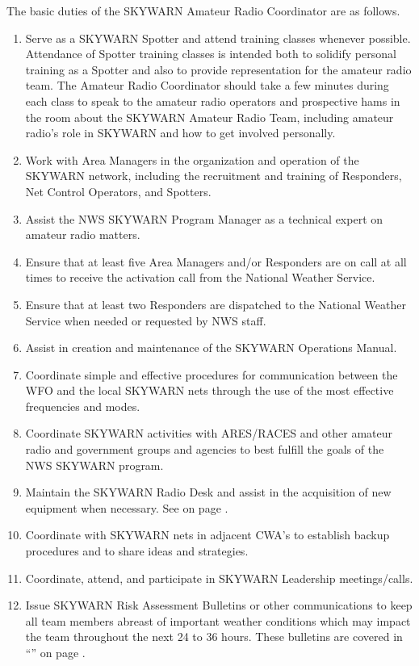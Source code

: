 \documentclass[pdflatex,letterpaper,twoside,12pt]{book}
\begin{document}
The basic duties of the SKYWARN Amateur Radio Coordinator are as follows.

\begin{enumerate}
\item Serve as a SKYWARN Spotter and attend training classes whenever possible.  Attendance of Spotter training classes is intended both to solidify personal training as a Spotter and also to provide representation for the amateur radio team.  The Amateur Radio Coordinator should take a few minutes during each class to speak to the amateur radio operators and prospective hams in the room about the SKYWARN Amateur Radio Team, including amateur radio's role in SKYWARN and how to get involved personally.
\item Work with Area Managers in the organization and operation of the SKYWARN network, including the recruitment and training of Responders, Net Control Operators, and Spotters.
\item Assist the NWS SKYWARN Program Manager as a technical expert on amateur radio matters.
\item Ensure that at least five Area Managers and/or Responders are on call at all times to receive the activation call from the National Weather Service.
\item Ensure that at least two Responders are dispatched to the National Weather Service when needed or requested by NWS staff.
\item Assist in creation and maintenance of the SKYWARN Operations Manual.
\item Coordinate simple and effective procedures for communication between the WFO and the local SKYWARN nets through the use of the most effective frequencies and modes.
\item Coordinate SKYWARN activities with ARES/RACES and other amateur radio and government groups and agencies to best fulfill the goals of the NWS SKYWARN program.
\item Maintain the SKYWARN Radio Desk and assist in the acquisition of new equipment when necessary.  See  on page \pageref{wx4akq-maint}.
\item Coordinate with SKYWARN nets in adjacent CWA's to establish backup procedures and to share ideas and strategies.
\item Coordinate, attend, and participate in SKYWARN Leadership meetings/calls.
\item Issue SKYWARN Risk Assessment Bulletins or other communications to keep all team members abreast of important weather conditions which may impact the team throughout the next 24 to 36 hours.  These bulletins are covered in ``'' on page \pageref{risk-assessments}.
\end{enumerate}
\end{document}
